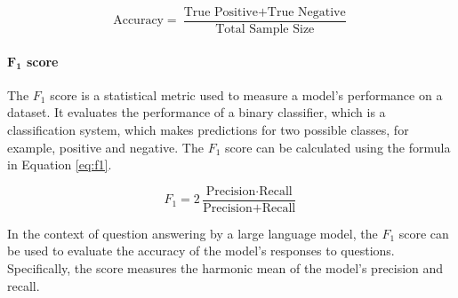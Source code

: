         \begin{equation}
            \text{Accuracy} = \frac{\text{True Positive} + \text{True Negative}}{\text{Total Sample Size}}
            \label{eq:accuracy}
        \end{equation}


        \paragraph{$\mathbf{F_1}$ score\\}

    
        The $F_1$ score is a statistical metric used to measure a model's performance on a dataset. It evaluates the performance of a binary classifier, which is a classification system, which makes predictions for two possible classes, for example, positive and negative. The $F_1$ score can be calculated using the formula in Equation \ref{eq:f1}.

        \begin{equation}
            F_1 = 2 \frac{\text{Precision} \cdot \text{Recall}}{\text{Precision} + \text{Recall}}
            \label{eq:f1}
        \end{equation}

        In the context of question answering by a large language model, the $F_1$ score can be used to evaluate the accuracy of the model's responses to questions. Specifically, the score measures the harmonic mean of the model's precision and recall.

        

        

